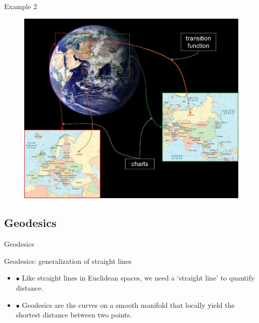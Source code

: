 \documentclass{beamer}
\begin{document}
\begin{frame}{Example 2}
\begin{figure}
\centering
\includegraphics[scale=0.4]{charts-globe.jpg}
\end{figure}
\end{frame}

\subsection{Geodesics}
\begin{frame}{Geodesics}
\begin{alertblock}{Geodesics: generalization of straight lines}
\begin{itemize}
  \item $\bullet$ Like straight lines in Euclidean spaces, we need a `straight line' to quantify distance.
  \item $\bullet$ Geodesics are the curves on a smooth manifold that locally yield the shortest distance between two points.
  \end{itemize}
  \end{alertblock}
\end{frame}
\end{document}
